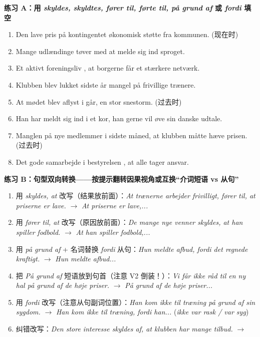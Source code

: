 \textbf{练习 A：用 \textit{skyldes, skyldtes, fører til, førte til, på grund af} 或 \textit{fordi} 填空}
\begin{enumerate}
  \item Den lave pris på kontingentet \underline{\hspace{2.2cm}} økonomisk støtte fra kommunen. (现在时)
  \item Mange udlændinge tøver med at melde sig ind \underline{\hspace{2.2cm}} sproget.
  \item Et aktivt foreningsliv \underline{\hspace{2.4cm}}, at borgerne får et stærkere netværk.
  \item Klubben blev lukket sidste år \underline{\hspace{2.2cm}} mangel på frivillige trænere.
  \item At mødet blev aflyst i går, \underline{\hspace{2.2cm}} en stor snestorm. (过去时)
  \item Han har meldt sig ind i et kor, \underline{\hspace{2.2cm}} han gerne vil øve sin danske udtale.
  \item Manglen på nye medlemmer \underline{\hspace{2.4cm}} i sidste måned, at klubben måtte hæve prisen. (过去时)
  \item Det gode samarbejde i bestyrelsen \underline{\hspace{2.2cm}}, at alle tager ansvar.
\end{enumerate}

\textbf{练习 B：句型双向转换——按提示翻转因果视角或互换“介词短语 vs 从句”}
\begin{enumerate}
  \item 用 \textit{skyldes, at} 改写（结果放前面）：\textit{At trænerne arbejder frivilligt, fører til, at priserne er lave.} $\rightarrow$ \textit{At priserne er lave,...}
  \item 用 \textit{fører til, at} 改写（原因放前面）：\textit{De mange nye venner skyldes, at han spiller fodbold.} $\rightarrow$ \textit{At han spiller fodbold,...}
  \item 用 \textit{på grund af} + 名词替换 \textit{fordi} 从句：\textit{Hun meldte afbud, fordi det regnede kraftigt.} $\rightarrow$ \textit{Hun meldte afbud...}
  \item 把 \textit{På grund af} 短语放到句首（注意 V2 倒装！）：\textit{Vi får ikke råd til en ny hal på grund af de høje priser.} $\rightarrow$ \textit{På grund af de høje priser...}
  \item 用 \textit{fordi} 改写（注意从句副词位置）：\textit{Han kom ikke til træning på grund af sin sygdom.} $\rightarrow$ \textit{Han kom ikke til træning, fordi han...} (\textit{ikke var rask / var syg})
  \item 纠错改写：\textit{Den store interesse skyldes af, at klubben har mange tilbud.} $\rightarrow$
\end{enumerate}

